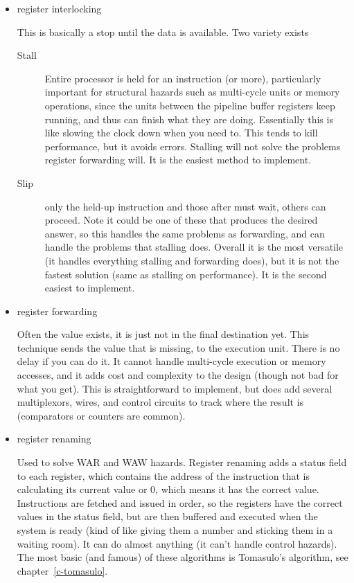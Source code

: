 \begin{itemize}

    \item register interlocking

        This is basically a stop until the data is available.  Two variety exists
        \begin{description}
            \item[Stall] Entire processor is held for an instruction (or more), particularly important for structural hazards such as multi-cycle units or memory operations, since the units between the pipeline buffer registers keep running, and thus can finish what they are doing.  Essentially this is like slowing the clock down when you need to.  This tends to kill performance, but it avoids errors.  Stalling will not solve the problems register forwarding will.  It is the easiest method to implement.
            \item[Slip] only the held-up instruction and those after must wait, others can proceed.  Note it could be one of these that produces the desired answer, so this handles the same problems as forwarding, and can handle the problems that stalling does.  Overall it is the most versatile (it handles everything stalling and forwarding does), but it is not the fastest solution (same as stalling on performance).  It is the second easiest to implement.
        \end{description}

    \item register forwarding
    
        Often the value exists, it is just not in the final destination yet.  This technique sends the value that is missing, to the execution unit.  There is no delay if you can do it.  It cannot handle multi-cycle execution or memory accesses, and it adds cost and complexity to the design (though not bad for what you get).  This is straightforward to implement, but does add several multiplexors, wires, and control circuits to track where the result is (comparators or counters are common).

    \item register renaming

        Used to solve WAR and WAW hazards.  Register renaming adds a status field to each register, which contains the address of the instruction that is calculating its current value or 0, which means it has the correct value.  Instructions are fetched and issued in order, so the registers have the correct values in the status field, but are then buffered and executed when the system is ready (kind of like giving them a number and sticking them in a waiting room).  It can do almost anything (it can't handle control hazards).  The most basic (and famous) of these algorithms is Tomasulo's algorithm, see chapter~\ref{c-tomasulo}.
    

\end{itemize}
